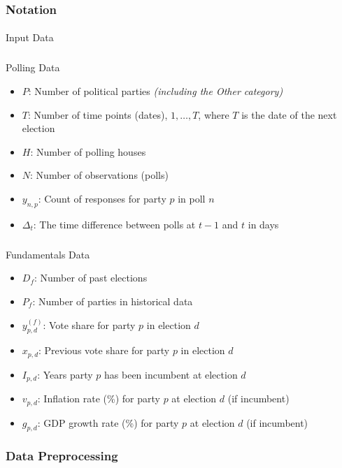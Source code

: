 \documentclass[
  letterpaper,
  DIV=11,
  numbers=noendperiod]{scrartcl}
\makeatletter
\let\oldparagraph\paragraph
\renewcommand{\paragraph}{
    \@ifstar
      \xxxParagraphStar
      \xxxParagraphNoStar
  }
\newcommand{\xxxParagraphStar}[1]{\oldparagraph*{#1}\mbox{}}
\newcommand{\xxxParagraphNoStar}[1]{\oldparagraph{#1}\mbox{}}
\let\oldsubparagraph\subparagraph
\renewcommand{\subparagraph}{
    \@ifstar
      \xxxSubParagraphStar
      \xxxSubParagraphNoStar
  }
\newcommand{\xxxSubParagraphStar}[1]{\oldsubparagraph*{#1}\mbox{}}
\newcommand{\xxxSubParagraphNoStar}[1]{\oldsubparagraph{#1}\mbox{}}
\providecommand{\tightlist}{%
  \setlength{\itemsep}{0pt}\setlength{\parskip}{0pt}}\usepackage{longtable,booktabs,array}
\makeatother
\begin{document}
\subsubsection{Notation}\label{notation}

\paragraph{Input Data}\label{input-data}

\subparagraph{Polling Data}\label{polling-data}

\begin{itemize}
\tightlist
\item
  \(P\): Number of political parties \emph{(including the Other
  category)}
\item
  \(T\): Number of time points (dates), \(1, \dots, T\), where \(T\) is
  the date of the next election
\item
  \(H\): Number of polling houses
\item
  \(N\): Number of observations (polls)
\item
  \(y_{n,p}\): Count of responses for party \(p\) in poll \(n\)
\item
  \(\Delta_t\): The time difference between polls at \(t-1\) and \(t\)
  in days
\end{itemize}

\subparagraph{Fundamentals Data}\label{fundamentals-data}

\begin{itemize}
\tightlist
\item
  \(D_f\): Number of past elections
\item
  \(P_f\): Number of parties in historical data
\item
  \(y_{p,d}^{(f)}\): Vote share for party \(p\) in election \(d\)
\item
  \(x_{p,d}\): Previous vote share for party \(p\) in election \(d\)
\item
  \(I_{p,d}\): Years party \(p\) has been incumbent at election \(d\)
\item
  \(v_{p,d}\): Inflation rate (\%) for party \(p\) at election \(d\) (if
  incumbent)
\item
  \(g_{p,d}\): GDP growth rate (\%) for party \(p\) at election \(d\)
  (if incumbent)
\end{itemize}

\subsubsection{Data Preprocessing}\label{data-preprocessing}
\end{document}
